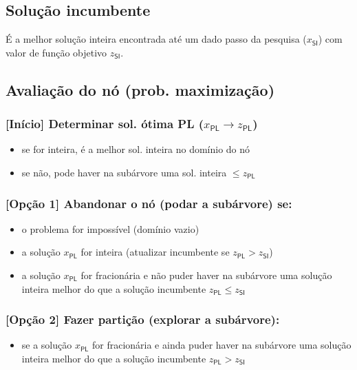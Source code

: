 \documentclass[10pt, a4paper]{article}
\begin{document}
\begin{multicols}{2}
\subsection{Solução incumbente}

É a melhor solução inteira encontrada até um dado passo da pesquisa (\(x_\textsf{SI}\)) com valor de função objetivo \(z_\textsf{SI}\).

\subsection{Avaliação do nó (prob. maximização)}

\subsubsection{[Início] Determinar sol. ótima PL (\(x_\textsf{PL} \rightarrow z_\textsf{PL}\))}

\begin{itemize}
    \item se for inteira, é a melhor sol. inteira no domínio do nó
    \item se não, pode haver na subárvore uma sol. inteira \(\le z_\textsf{PL}\)
\end{itemize}

\subsubsection{[Opção 1] Abandonar o nó (podar a subárvore) se:}

\begin{itemize}
    \item o problema for impossível (domínio vazio)
    \item a solução \(x_\textsf{PL}\) for inteira (atualizar incumbente se \(z_\textsf{PL} > z_\textsf{SI}\))
    \item a solução \(x_\textsf{PL}\) for fracionária e não puder haver na subárvore uma solução inteira melhor do que a solução incumbente \(z_\textsf{PL} \le z_\textsf{SI}\)
\end{itemize}

\subsubsection{[Opção 2] Fazer partição (explorar a subárvore):}

\begin{itemize}
    \item se a solução \(x_\textsf{PL}\) for fracionária e ainda puder haver na subárvore uma solução inteira melhor do que a solução incumbente \(z_\textsf{PL} > z_\textsf{SI}\)
\end{itemize}


\end{multicols}
\end{document}

